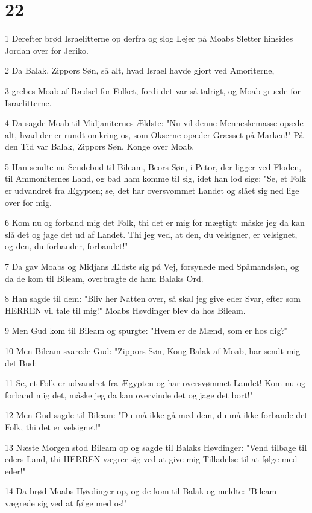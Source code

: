 \chapter{22}

\par 1 Derefter brød Israelitterne op derfra og slog Lejer på Moabs Sletter hinsides Jordan over for Jeriko.
\par 2 Da Balak, Zippors Søn, så alt, hvad Israel havde gjort ved Amoriterne,
\par 3 grebes Moab af Rædsel for Folket, fordi det var så talrigt, og Moab gruede for Israelitterne.
\par 4 Da sagde Moab til Midjaniternes Ældste: "Nu vil denne Menneskemasse opæde alt, hvad der er rundt omkring os, som Okserne opæder Græsset på Marken!" På den Tid var Balak, Zippors Søn, Konge over Moab.
\par 5 Han sendte nu Sendebud til Bileam, Beors Søn, i Petor, der ligger ved Floden, til Ammoniternes Land, og bad ham komme til sig, idet han lod sige: "Se, et Folk er udvandret fra Ægypten; se, det har oversvømmet Landet og slået sig ned lige over for mig.
\par 6 Kom nu og forband mig det Folk, thi det er mig for mægtigt: måske jeg da kan slå det og jage det ud af Landet. Thi jeg ved, at den, du velsigner, er velsignet, og den, du forbander, forbandet!"
\par 7 Da gav Moabs og Midjans Ældste sig på Vej, forsynede med Spåmandsløn, og da de kom til Bileam, overbragte de ham Balaks Ord.
\par 8 Han sagde til dem: "Bliv her Natten over, så skal jeg give eder Svar, efter som HERREN vil tale til mig!" Moabs Høvdinger blev da hos Bileam.
\par 9 Men Gud kom til Bileam og spurgte: "Hvem er de Mænd, som er hos dig?"
\par 10 Men Bileam svarede Gud: "Zippors Søn, Kong Balak af Moab, har sendt mig det Bud:
\par 11 Se, et Folk er udvandret fra Ægypten og har oversvømmet Landet! Kom nu og forband mig det, måske jeg da kan overvinde det og jage det bort!"
\par 12 Men Gud sagde til Bileam: "Du må ikke gå med dem, du må ikke forbande det Folk, thi det er velsignet!"
\par 13 Næste Morgen stod Bileam op og sagde til Balaks Høvdinger: "Vend tilbage til eders Land, thi HERREN vægrer sig ved at give mig Tilladelse til at følge med eder!"
\par 14 Da brød Moabs Høvdinger op, og de kom til Balak og meldte: "Bileam vægrede sig ved at følge med os!"
